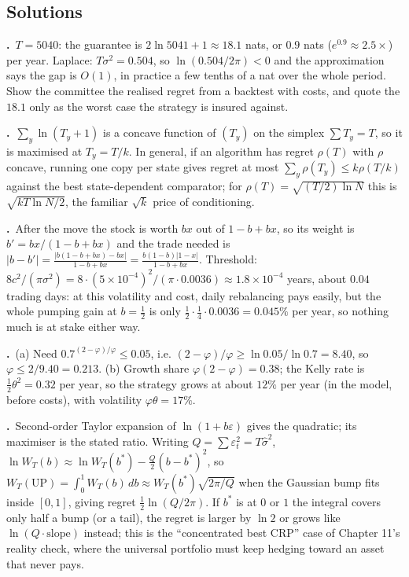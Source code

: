 \documentclass[11pt,a4paper,openany]{book}
\newcommand{\eps}{\varepsilon}
\newcommand{\abs}[1]{\lvert #1\rvert}
\newenvironment{solutions}{\small}{}
\newcommand{\sol}[2]{\par\smallskip\noindent\textbf{\sffamily #1.}\ #2\par}
\begin{document}
\subsection*{Solutions}
\begin{solutions}
\sol{18.1}{$T=5040$: the guarantee is $2\ln5041+1\approx18.1$ nats, or $0.9$ nats ($e^{0.9}\approx2.5\times$) per year. Laplace: $T\sigma^2=0.504$, so $\ln(0.504/2\pi)<0$ and the approximation says the gap is $O(1)$, in practice a few tenths of a nat over the whole period. Show the committee the realised regret from a backtest with costs, and quote the $18.1$ only as the worst case the strategy is insured against.}
\sol{18.2}{$\sum_y\ln(T_y+1)$ is a concave function of $(T_y)$ on the simplex $\sum T_y=T$, so it is maximised at $T_y=T/k$. In general, if an algorithm has regret $\rho(T)$ with $\rho$ concave, running one copy per state gives regret at most $\sum_y\rho(T_y)\le k\rho(T/k)$ against the best state-dependent comparator; for $\rho(T)=\sqrt{(T/2)\ln N}$ this is $\sqrt{kT\ln N/2}$, the familiar $\sqrt k$ price of conditioning.}
\sol{18.3}{After the move the stock is worth $bx$ out of $1-b+bx$, so its weight is $b'=bx/(1-b+bx)$ and the trade needed is $\abs{b-b'}=\frac{\abs{b(1-b+bx)-bx}}{1-b+bx}=\frac{b(1-b)\abs{1-x}}{1-b+bx}$. Threshold: $8c^2/(\pi\sigma^2)=8\cdot(5\times10^{-4})^2/(\pi\cdot0.0036)\approx1.8\times10^{-4}$ years, about $0.04$ trading days: at this volatility and cost, daily rebalancing pays easily, but the whole pumping gain at $b=\tfrac12$ is only $\tfrac12\cdot\tfrac14\cdot0.0036=0.045\%$ per year, so nothing much is at stake either way.}
\sol{18.4}{(a) Need $0.7^{(2-\varphi)/\varphi}\le0.05$, i.e. $(2-\varphi)/\varphi\ge\ln0.05/\ln0.7=8.40$, so $\varphi\le2/9.40=0.213$. (b) Growth share $\varphi(2-\varphi)=0.38$; the Kelly rate is $\tfrac12\theta^2=0.32$ per year, so the strategy grows at about $12\%$ per year (in the model, before costs), with volatility $\varphi\theta=17\%$.}
\sol{18.5}{Second-order Taylor expansion of $\ln(1+b\eps)$ gives the quadratic; its maximiser is the stated ratio. Writing $Q=\sum\eps_t^2=T\hat\sigma^2$, $\ln W_T(b)\approx\ln W_T(b^*)-\tfrac Q2(b-b^*)^2$, so $W_T(\mathrm{UP})=\int_0^1W_T(b)\,db\approx W_T(b^*)\sqrt{2\pi/Q}$ when the Gaussian bump fits inside $[0,1]$, giving regret $\tfrac12\ln(Q/2\pi)$. If $b^*$ is at $0$ or $1$ the integral covers only half a bump (or a tail), the regret is larger by $\ln2$ or grows like $\ln(Q\cdot\text{slope})$ instead; this is the ``concentrated best CRP'' case of Chapter 11's reality check, where the universal portfolio must keep hedging toward an asset that never pays.}
\end{solutions}
\end{document}
